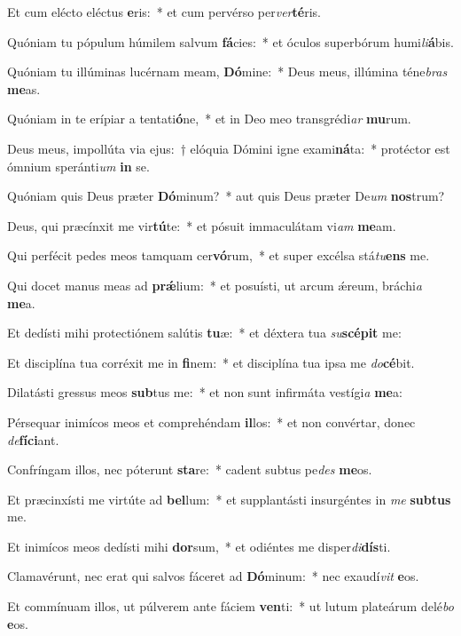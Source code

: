 \item Et cum elécto eléctus \textbf{e}ris:~* et cum pervérso per\textit{ver}\textbf{té}ris.
\item Quóniam tu pópulum húmilem salvum \textbf{fá}cies:~* et óculos superbórum humi\textit{li}\textbf{á}bis.
\item Quóniam tu illúminas lucérnam meam, \textbf{Dó}mine:~* Deus meus, illúmina téne\textit{bras} \textbf{me}as.
\item Quóniam in te erípiar a tentati\textbf{ó}ne,~* et in Deo meo transgrédi\textit{ar} \textbf{mu}rum.
\item Deus meus, impollúta via ejus:~† elóquia Dómini igne exami\textbf{ná}ta:~* protéctor est ómnium speránti\textit{um} \textbf{in} se.
\item Quóniam quis Deus præter \textbf{Dó}minum?~* aut quis Deus præter De\textit{um} \textbf{nos}trum?
\item Deus, qui præcínxit me vir\textbf{tú}te:~* et pósuit immaculátam vi\textit{am} \textbf{me}am.
\item Qui perfécit pedes meos tamquam cer\textbf{vó}rum,~* et super excélsa stá\textit{tu}\textbf{ens} me.
\item Qui docet manus meas ad \textbf{prǽ}lium:~* et posuísti, ut arcum ǽreum, bráchi\textit{a} \textbf{me}a.
\item Et dedísti mihi protectiónem salútis \textbf{tu}æ:~* et déxtera tua \textit{su}\textbf{scé}\textbf{pit} me:
\item Et disciplína tua corréxit me in \textbf{fi}nem:~* et disciplína tua ipsa me \textit{do}\textbf{cé}bit.
\item Dilatásti gressus meos \textbf{sub}tus me:~* et non sunt infirmáta vestígi\textit{a} \textbf{me}a:
\item Pérsequar inimícos meos et comprehéndam \textbf{il}los:~* et non convértar, donec \textit{de}\textbf{fí}\textbf{ci}ant.
\item Confríngam illos, nec póterunt \textbf{sta}re:~* cadent subtus pe\textit{des} \textbf{me}os.
\item Et præcinxísti me virtúte ad \textbf{bel}lum:~* et supplantásti insurgéntes in \textit{me} \textbf{sub}\textbf{tus} me.
\item Et inimícos meos dedísti mihi \textbf{dor}sum,~* et odiéntes me disper\textit{di}\textbf{dís}ti.
\item Clamavérunt, nec erat qui salvos fáceret ad \textbf{Dó}minum:~* nec exaudí\textit{vit} \textbf{e}os.
\item Et commínuam illos, ut púlverem ante fáciem \textbf{ven}ti:~* ut lutum plateárum delé\textit{bo} \textbf{e}os.
